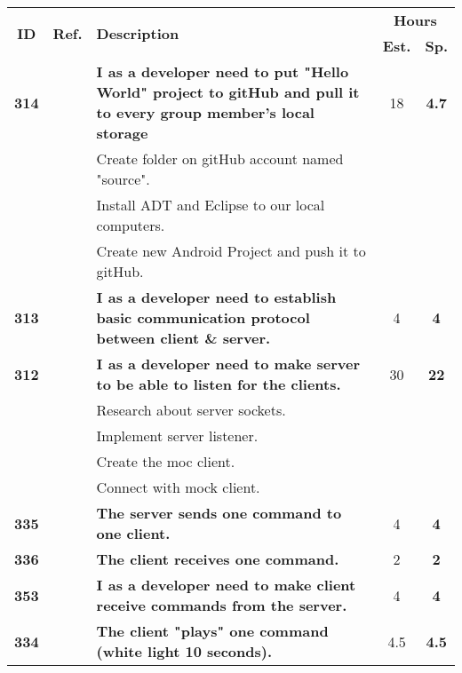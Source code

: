   \label{tab:sprint1stories}
 \def\arraystretch{1.25}
 
\begin{longtable}{ccXcc}

\toprule[1mm]
\multirow{2}{*}{\textbf{ID}} &
\multirow{2}{*}{\textbf{Ref.}} & \multirow{2}{*}{\textbf{Description}} & \multicolumn{2}{c}{\textbf{Hours}} \\
 					& & & \textbf{Est.} & \textbf{Sp.} \\
\midrule
\textbf{314} 	& {M6}
	& {\bf I as a developer need to put "Hello World" project to gitHub and pull it to every group member's local storage} 	& 	18	& \textbf{ 4.7} \\
				&& Create folder on gitHub account named "source".	&  &  \\
				&& Install ADT and Eclipse to our local computers. 	&  &  \\
				&& Create new Android Project and push it to gitHub. 	&  &  \\


\textbf{313} 	& {C1}
	& {\bf I as a developer need to establish basic communication protocol between client \& server.} 	& 		4	& \textbf{4} \\
	
\textbf{312} 	& {C1}
	& {\bf I as a developer need to make server to be able to listen for the clients.} 	& 	30	& \textbf{22} \\
				&& Research about server sockets.	&  &  \\
				&& Implement server listener.	&  &  \\
				&& Create the moc client. &  &  \\
				&& Connect with mock client. &  &  \\
	
\textbf{335} 	& {M6}
	& {\bf The server sends one command to one client. } 	& 		4	& \textbf{4} \\

\textbf{336} 	& {M6}
	& {\bf The client receives one command. } 	& 	2	& \textbf{2} \\

\textbf{353} 	& {M6}
	& {\bf I as a developer need to make client receive commands from the server.} 	& 	4		& \textbf{4} \\

\textbf{334} 	& {M6}
	& {\bf The client "plays" one command (white light 10 seconds). } 	& 		4.5	& \textbf{4.5} \\


\end{longtable}
